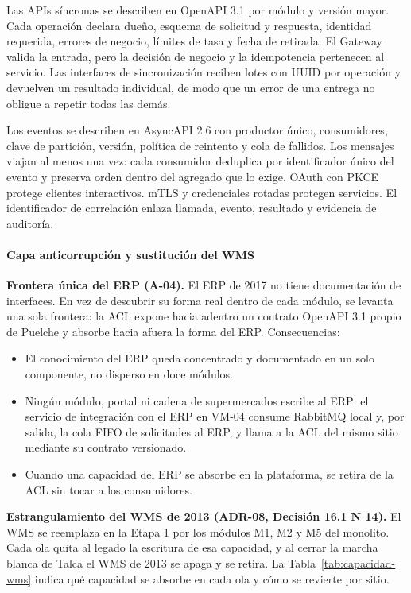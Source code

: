 Las APIs síncronas se describen en OpenAPI 3.1 por módulo y versión mayor. Cada operación declara dueño, esquema de solicitud y respuesta, identidad requerida, errores de negocio, límites de tasa y fecha de retirada. El Gateway valida la entrada, pero la decisión de negocio y la idempotencia pertenecen al servicio. Las interfaces de sincronización reciben lotes con UUID por operación y devuelven un resultado individual, de modo que un error de una entrega no obligue a repetir todas las demás.

Los eventos se describen en AsyncAPI 2.6 con productor único, consumidores, clave de partición, versión, política de reintento y cola de fallidos. Los mensajes viajan al menos una vez: cada consumidor deduplica por identificador único del evento y preserva orden dentro del agregado que lo exige. OAuth con PKCE protege clientes interactivos. mTLS y credenciales rotadas protegen servicios. El identificador de correlación enlaza llamada, evento, resultado y evidencia de auditoría.

\paragraph{Capa anticorrupción y sustitución del WMS}
\label{subsubsec:acl-estrangulamiento}

\textbf{Frontera única del ERP (A-04).} El ERP de 2017 no tiene documentación de interfaces. En vez de descubrir su forma real dentro de cada módulo, se levanta una sola frontera: la ACL expone hacia adentro un contrato OpenAPI 3.1 propio de Puelche y absorbe hacia afuera la forma del ERP. Consecuencias:

\begin{itemize}
  \item El conocimiento del ERP queda concentrado y documentado en un solo componente, no disperso en doce módulos.
  \item Ningún módulo, portal ni cadena de supermercados escribe al ERP: el servicio de integración con el ERP en VM-04 consume RabbitMQ local y, por salida, la cola FIFO de solicitudes al ERP, y llama a la ACL del mismo sitio mediante su contrato versionado.
  \item Cuando una capacidad del ERP se absorbe en la plataforma, se retira de la ACL sin tocar a los consumidores.
\end{itemize}

\textbf{Estrangulamiento del WMS de 2013 (ADR-08, Decisión 16.1 N\textdegree{} 14).} El WMS se reemplaza en la Etapa 1 por los módulos M1, M2 y M5 del monolito. Cada ola quita al legado la escritura de esa capacidad, y al cerrar la marcha blanca de Talca el WMS de 2013 se apaga y se retira. La Tabla~\ref{tab:capacidad-wms} indica qué capacidad se absorbe en cada ola y cómo se revierte por sitio.

